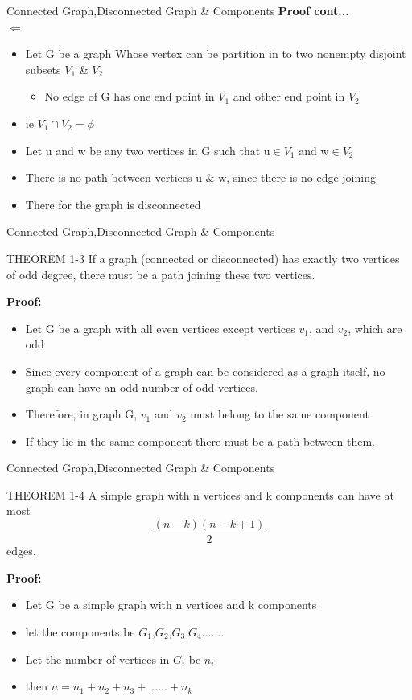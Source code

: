 \documentclass{beamer}
\begin{document}
\begin{frame}{Connected Graph,Disconnected Graph \& Components}
	\textbf{Proof cont...}\\
	$\Leftarrow$
	\begin{itemize}
		\item Let  G be a graph Whose vertex can be partition in to two nonempty disjoint subsets $V_1$ \& $V_2$
		\begin{itemize}
			\item No edge of G has one end point in $V_1$ and other end point in $V_2$
		\end{itemize}
		\item ie $V_1\cap V_2=\phi$
		
	\item Let u and w be any two vertices in G such that u$\in$$V_1$ and w$\in$$V_2$
	\item There is no path between vertices u \& w, since there is no edge joining
	\item There for the graph is disconnected
	\end{itemize}
\end{frame}
\begin{frame}{Connected Graph,Disconnected Graph \& Components}
\begin{block}{THEOREM 1-3 }
	If a graph (connected or disconnected) has exactly two vertices of odd degree, there 
	must be a path joining these two vertices.
\end{block}
\textbf{Proof:}
\begin{itemize}
	\item Let G be a graph with all even vertices except vertices $v_1$, and $v_2$, which are odd
	\item Since every component of a graph can be considered as a graph itself,  no graph can have an odd number of odd vertices.
	\item Therefore, in graph G, $v_1$ and $v_2$ must 
	belong to the same component
	\item If they lie in the same component there must be a path between them.
\end{itemize}
\end{frame}
\begin{frame}{Connected Graph,Disconnected Graph \& Components}
	\begin{block}{THEOREM 1-4 }
	A simple graph  with n vertices and k 
	components can have at most $$\frac{(n-k)(n-k+1)}{2}$$edges.
	\end{block}
	\textbf{Proof:}
	\begin{itemize}
		\item Let G be a simple graph  with n vertices and k components
		\item let the components be $G_1$,$G_2$,$G_3$,$G_4$.......
		\item Let the number of vertices in $G_i$ be $n_i$
		\item then $n=n_1+n_2+n_3+......+n_k$
	\end{itemize}
\end{frame}
\end{document}
